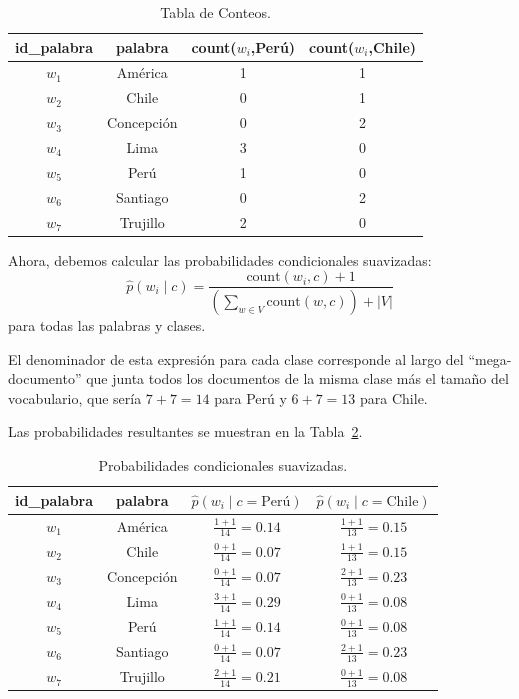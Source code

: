 \documentclass[11pt,fleqn]{book} %
\begin{document}
\begin{example}
\begin{table}[h]
\centering
\begin{tabular}{|c|c|c|c|}
\hline
id\_palabra & palabra & count($w_i$,Perú) & count($w_i$,Chile) \\
\hline
$w_1$ & América & 1 & 1 \\
$w_2$ & Chile & 0 & 1 \\
$w_3$ & Concepción & 0 & 2 \\
$w_4$ & Lima & 3 & 0 \\
$w_5$ & Perú & 1 & 0 \\
$w_6$ & Santiago & 0 & 2 \\
$w_7$ & Trujillo & 2 & 0 \\
\hline
\end{tabular}
\caption{Tabla de Conteos.}
\label{tab_nb_conteos}
\end{table}

Ahora, debemos calcular las probabilidades condicionales suavizadas:
\[
\hat{p}(w_i \mid c) = \frac{\text{count}(w_i, c) + 1}{\left(\sum_{w \in V} \text{count}(w, c)\right) + |V|}
\]
para todas las palabras y clases.

El denominador de esta expresión para cada clase corresponde al largo del ``mega-documento'' que junta todos los documentos de la misma clase más el tamaño del vocabulario, que sería $7+7=14$ para Perú y $6+7=13$ para Chile.

Las probabilidades resultantes se muestran en la Tabla~\ref{tab_nb_probs}.

\begin{table}[h]
\centering
\begin{tabular}{|c|c|c|c|}
\hline
id\_palabra & palabra & $\hat{p}(w_i \mid c=\text{Perú})$ & $\hat{p}(w_i \mid c=\text{Chile})$ \\
\hline
$w_1$ & América & $\frac{1+1}{14}=0.14$ & $\frac{1+1}{13}=0.15$ \\
$w_2$ & Chile & $\frac{0+1}{14}=0.07$ & $\frac{1+1}{13}=0.15$ \\
$w_3$ & Concepción & $\frac{0+1}{14}=0.07$ & $\frac{2+1}{13}=0.23$ \\
$w_4$ & Lima & $\frac{3+1}{14}=0.29$ & $\frac{0+1}{13}=0.08$ \\
$w_5$ & Perú & $\frac{1+1}{14}=0.14$ & $\frac{0+1}{13}=0.08$ \\
$w_6$ & Santiago & $\frac{0+1}{14}=0.07$ & $\frac{2+1}{13}=0.23$ \\
$w_7$ & Trujillo & $\frac{2+1}{14}=0.21$ & $\frac{0+1}{13}=0.08$ \\
\hline
\end{tabular}
\caption{Probabilidades condicionales suavizadas.}
\label{tab_nb_probs}
\end{table}


\end{example}
\end{document}
